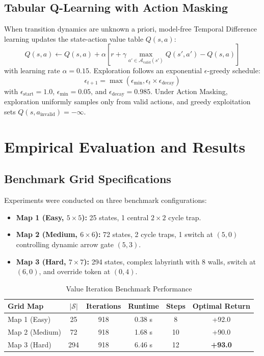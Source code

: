 \documentclass[conference]{IEEEtran}
\begin{document}
\subsection{Tabular Q-Learning with Action Masking}
When transition dynamics are unknown a priori, model-free Temporal Difference learning updates the state-action value table $Q(s, a)$:
\begin{equation}
Q(s, a) \leftarrow Q(s, a) + \alpha \left[ r + \gamma \max_{a' \in \mathcal{A}_{\text{valid}}(s')} Q(s', a') - Q(s, a) \right]
\label{eq:qlearning}
\end{equation}
with learning rate $\alpha = 0.15$. Exploration follows an exponential $\epsilon$-greedy schedule:
\begin{equation}
\epsilon_{t+1} = \max(\epsilon_{\min}, \epsilon_t \times \epsilon_{\text{decay}})
\end{equation}
with $\epsilon_{\text{start}} = 1.0$, $\epsilon_{\min} = 0.05$, and $\epsilon_{\text{decay}} = 0.985$. Under Action Masking, exploration uniformly samples only from valid actions, and greedy exploitation sets $Q(s, a_{\text{invalid}}) = -\infty$.

\section{Empirical Evaluation and Results}

\subsection{Benchmark Grid Specifications}
Experiments were conducted on three benchmark configurations:
\begin{itemize}
    \item \textbf{Map 1 (Easy, $5 \times 5$):} 25 states, 1 central $2 \times 2$ cycle trap.
    \item \textbf{Map 2 (Medium, $6 \times 6$):} 72 states, 2 cycle traps, 1 switch at $(5, 0)$ controlling dynamic arrow gate $(5, 3)$.
    \item \textbf{Map 3 (Hard, $7 \times 7$):} 294 states, complex labyrinth with 8 walls, switch at $(6, 0)$, and override token at $(0, 4)$.
\end{itemize}

\begin{table}[htbp]
\caption{Value Iteration Benchmark Performance}
\begin{center}
\begin{tabular}{lccccc}
\toprule
\textbf{Grid Map} & \textbf{$|\mathcal{S}|$} & \textbf{Iterations} & \textbf{Runtime} & \textbf{Steps} & \textbf{Optimal Return} \\
\midrule
Map 1 (Easy) & 25 & 918 & 0.38 s & 8 & +92.0 \\
Map 2 (Medium) & 72 & 918 & 1.68 s & 10 & +90.0 \\
Map 3 (Hard) & 294 & 918 & 6.46 s & 12 & \textbf{+93.0} \\
\bottomrule
\end{tabular}
\label{tab:vi_results}
\end{center}
\end{table}
\end{document}

